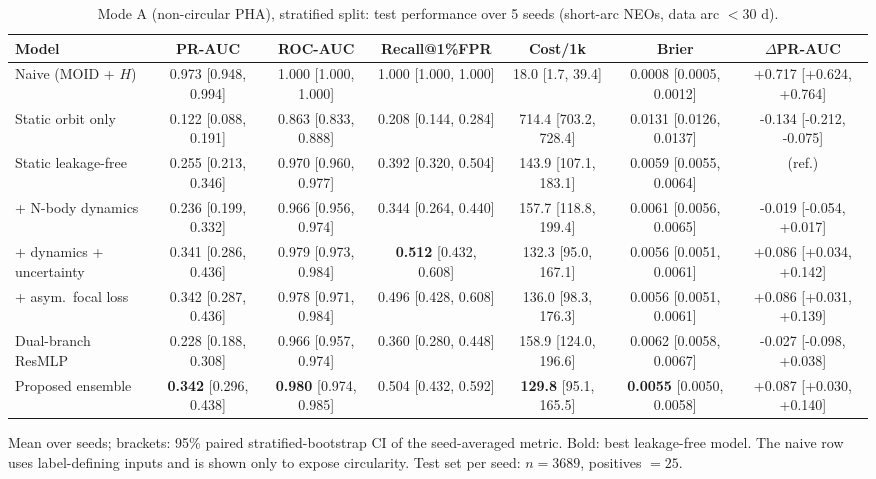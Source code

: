 \begin{table}[t]
\centering
\small
\caption{Mode A (non-circular PHA), stratified split: test performance over 5 seeds (short-arc NEOs, data arc $<30$ d).}
\label{tab:pha_stratified_short_arc}
\begin{tabular}{lcccccc}
\toprule
Model & PR-AUC & ROC-AUC & Recall@1\%FPR & Cost/1k & Brier & $\Delta$PR-AUC \\
\midrule
Naive (MOID + $H$) & 0.973 \scriptsize{[0.948, 0.994]} & 1.000 \scriptsize{[1.000, 1.000]} & 1.000 \scriptsize{[1.000, 1.000]} & 18.0 \scriptsize{[1.7, 39.4]} & 0.0008 \scriptsize{[0.0005, 0.0012]} & +0.717 \scriptsize{[+0.624, +0.764]} \\
\midrule
Static orbit only & 0.122 \scriptsize{[0.088, 0.191]} & 0.863 \scriptsize{[0.833, 0.888]} & 0.208 \scriptsize{[0.144, 0.284]} & 714.4 \scriptsize{[703.2, 728.4]} & 0.0131 \scriptsize{[0.0126, 0.0137]} & -0.134 \scriptsize{[-0.212, -0.075]} \\
Static leakage-free & 0.255 \scriptsize{[0.213, 0.346]} & 0.970 \scriptsize{[0.960, 0.977]} & 0.392 \scriptsize{[0.320, 0.504]} & 143.9 \scriptsize{[107.1, 183.1]} & 0.0059 \scriptsize{[0.0055, 0.0064]} & (ref.) \\
+ N-body dynamics & 0.236 \scriptsize{[0.199, 0.332]} & 0.966 \scriptsize{[0.956, 0.974]} & 0.344 \scriptsize{[0.264, 0.440]} & 157.7 \scriptsize{[118.8, 199.4]} & 0.0061 \scriptsize{[0.0056, 0.0065]} & -0.019 \scriptsize{[-0.054, +0.017]} \\
+ dynamics + uncertainty & 0.341 \scriptsize{[0.286, 0.436]} & 0.979 \scriptsize{[0.973, 0.984]} & \textbf{0.512} \scriptsize{[0.432, 0.608]} & 132.3 \scriptsize{[95.0, 167.1]} & 0.0056 \scriptsize{[0.0051, 0.0061]} & +0.086 \scriptsize{[+0.034, +0.142]} \\
+ asym.\ focal loss & 0.342 \scriptsize{[0.287, 0.436]} & 0.978 \scriptsize{[0.971, 0.984]} & 0.496 \scriptsize{[0.428, 0.608]} & 136.0 \scriptsize{[98.3, 176.3]} & 0.0056 \scriptsize{[0.0051, 0.0061]} & +0.086 \scriptsize{[+0.031, +0.139]} \\
Dual-branch ResMLP & 0.228 \scriptsize{[0.188, 0.308]} & 0.966 \scriptsize{[0.957, 0.974]} & 0.360 \scriptsize{[0.280, 0.448]} & 158.9 \scriptsize{[124.0, 196.6]} & 0.0062 \scriptsize{[0.0058, 0.0067]} & -0.027 \scriptsize{[-0.098, +0.038]} \\
Proposed ensemble & \textbf{0.342} \scriptsize{[0.296, 0.438]} & \textbf{0.980} \scriptsize{[0.974, 0.985]} & 0.504 \scriptsize{[0.432, 0.592]} & \textbf{129.8} \scriptsize{[95.1, 165.5]} & \textbf{0.0055} \scriptsize{[0.0050, 0.0058]} & +0.087 \scriptsize{[+0.030, +0.140]} \\
\bottomrule
\end{tabular}
\par\vspace{2pt}\footnotesize Mean over seeds; brackets: 95\% paired stratified-bootstrap CI of the seed-averaged metric. Bold: best leakage-free model. The naive row uses label-defining inputs and is shown only to expose circularity. Test set per seed: $n=3689$, positives $=25$.
\end{table}
